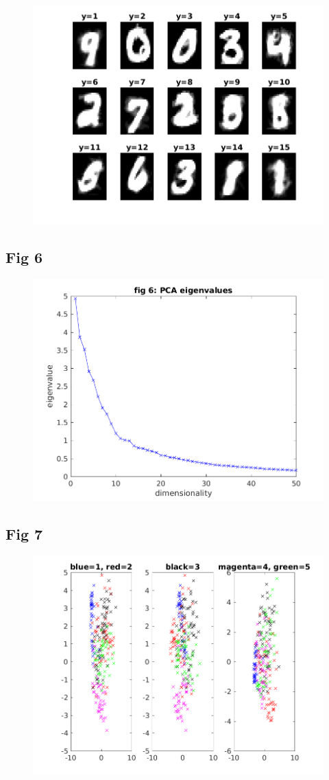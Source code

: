 \documentclass{article}
\begin{document}
\begin{figure}[h!]
\begin{multicols}{3}
\includegraphics[width=1\columnwidth]{RunResults2/5.png}
\label{5}
\end{multicols}
\end{figure}

\subsection{Fig 6}
\begin{figure}[h!]
\begin{center}
\includegraphics[width=0.5\columnwidth]{RunResults2/6.png}
\label{6}
\end{center}
\end{figure}
\newpage
\subsection{ Fig 7}
\begin{figure}[h!]
\begin{center}
\includegraphics[width=0.5\columnwidth]{RunResults2/7.png}
\label{7}
\end{center}
\end{figure}
\end{document}
